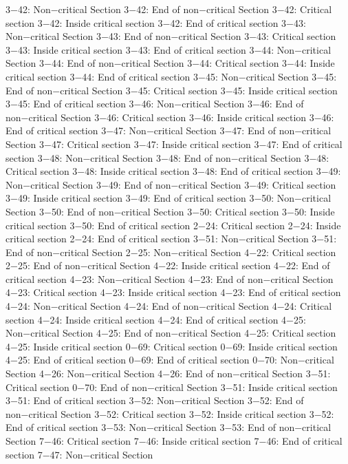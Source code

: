 3−42: Non−critical Section
3−42: End of non−critical Section
3−42: Critical section
3−42: Inside critical section
3−42: End of critical section
3−43: Non−critical Section
3−43: End of non−critical Section
3−43: Critical section
3−43: Inside critical section
3−43: End of critical section
3−44: Non−critical Section
3−44: End of non−critical Section
3−44: Critical section
3−44: Inside critical section
3−44: End of critical section
3−45: Non−critical Section
3−45: End of non−critical Section
3−45: Critical section
3−45: Inside critical section
3−45: End of critical section
3−46: Non−critical Section
3−46: End of non−critical Section
3−46: Critical section
3−46: Inside critical section
3−46: End of critical section
3−47: Non−critical Section
3−47: End of non−critical Section
3−47: Critical section
3−47: Inside critical section
3−47: End of critical section
3−48: Non−critical Section
3−48: End of non−critical Section
3−48: Critical section
3−48: Inside critical section
3−48: End of critical section
3−49: Non−critical Section
3−49: End of non−critical Section
3−49: Critical section
3−49: Inside critical section
3−49: End of critical section
3−50: Non−critical Section
3−50: End of non−critical Section
3−50: Critical section
3−50: Inside critical section
3−50: End of critical section
2−24: Critical section
2−24: Inside critical section
2−24: End of critical section
3−51: Non−critical Section
3−51: End of non−critical Section
2−25: Non−critical Section
4−22: Critical section
2−25: End of non−critical Section
4−22: Inside critical section
4−22: End of critical section
4−23: Non−critical Section
4−23: End of non−critical Section
4−23: Critical section
4−23: Inside critical section
4−23: End of critical section
4−24: Non−critical Section
4−24: End of non−critical Section
4−24: Critical section
4−24: Inside critical section
4−24: End of critical section
4−25: Non−critical Section
4−25: End of non−critical Section
4−25: Critical section
4−25: Inside critical section
0−69: Critical section
0−69: Inside critical section
4−25: End of critical section
0−69: End of critical section
0−70: Non−critical Section
4−26: Non−critical Section
4−26: End of non−critical Section
3−51: Critical section
0−70: End of non−critical Section
3−51: Inside critical section
3−51: End of critical section
3−52: Non−critical Section
3−52: End of non−critical Section
3−52: Critical section
3−52: Inside critical section
3−52: End of critical section
3−53: Non−critical Section
3−53: End of non−critical Section
7−46: Critical section
7−46: Inside critical section
7−46: End of critical section
7−47: Non−critical Section

